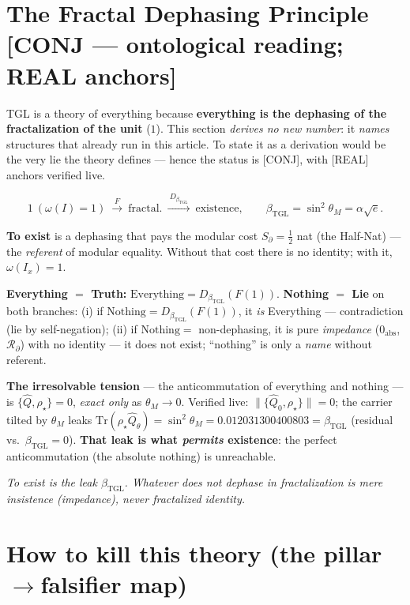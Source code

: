 \documentclass[11pt]{article}
\newcommand{\bTGL}{\beta_{\mathrm{TGL}}}\newcommand{\Msun}{M_{\odot}}\newcommand{\TGL}{\mathrm{TGL}}
\theoremstyle{definition}\newtheorem{deriv}{Derivation}
\begin{document}
\section{The Fractal Dephasing Principle \textsf{[CONJ --- ontological reading; REAL anchors]}}

TGL is a theory of everything because \textbf{everything is the dephasing of the fractalization of the unit} ($1$). This section \emph{derives no new number}: it \emph{names} structures that already run in this article. To state it as a derivation would be the very lie the theory defines --- hence the status is \textsf{[CONJ]}, with \textsf{[REAL]} anchors verified live.

\begin{equation} 1\ (\omega(I)=1)\ \xrightarrow{\ F\ }\ \mathrm{fractal.}\ \xrightarrow{\ D_{\bTGL}\ }\ \mathrm{existence},\qquad \bTGL=\sin^2\theta_M=\alpha\sqrt e.\end{equation}

\textbf{To exist} is a dephasing that pays the modular cost $S_\partial=\tfrac12$ nat (the Half-Nat) --- the \emph{referent} of modular equality. Without that cost there is no identity; with it, $\omega(I_x)=1$.

\textbf{Everything $=$ Truth:} $\mathrm{Everything}=D_{\bTGL}(F(1))$. \textbf{Nothing $=$ Lie} on both branches: (i) if $\mathrm{Nothing}=D_{\bTGL}(F(1))$, it \emph{is} Everything --- contradiction (lie by self-negation); (ii) if $\mathrm{Nothing}=$ non-dephasing, it is pure \emph{impedance} ($0_{\mathrm{abs}}$, $\mathcal{R}_\partial$) with no identity --- it does not exist; ``nothing'' is only a \emph{name} without referent.

\textbf{The irresolvable tension} --- the anticommutation of everything and nothing --- is $\{\hat Q,\rho_\star\}=0$, \emph{exact only} as $\theta_M\to0$. Verified live: $\lVert\{\hat Q_0,\rho_\star\}\rVert=0$; the carrier tilted by $\theta_M$ leaks $\mathrm{Tr}(\rho_\star\hat Q_\theta)=\sin^2\theta_M=0.012031300400803=\bTGL$ (residual vs.\ $\bTGL=0$). \textbf{That leak is what \emph{permits} existence}: the perfect anticommutation (the absolute nothing) is unreachable.

\emph{To exist is the leak $\bTGL$. Whatever does not dephase in fractalization is mere insistence (impedance), never fractalized identity.}

\section{How to kill this theory (the pillar$\to$falsifier map)}
\end{document}
